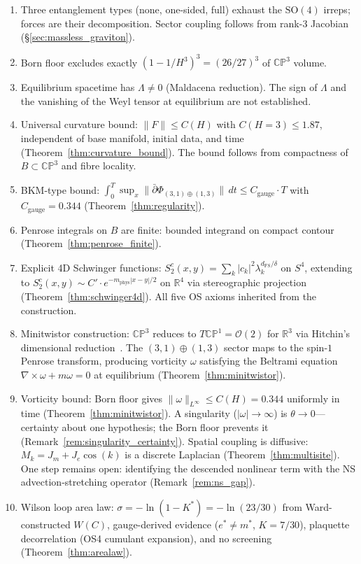 \documentclass[11pt,a4paper]{article}
\theoremstyle{definition}
\theoremstyle{remark}
\newcommand{\CP}{\mathbb{CP}}
\newcommand{\R}{\mathbb{R}}
\newcommand{\dbar}{\bar{\partial}}
\begin{document}
\begin{enumerate}[nosep]
\item Three entanglement types (none, one-sided, full) exhaust the $\mathrm{SO}(4)$ irreps; forces are their decomposition. Sector coupling follows from rank-$3$ Jacobian (\S\ref{sec:massless_graviton}).
\item Born floor excludes exactly $(1-1/H^3)^3=(26/27)^3$ of $\CP^3$ volume.
\item Equilibrium spacetime has $\Lambda\neq 0$ (Maldacena reduction). The sign of $\Lambda$ and the vanishing of the Weyl tensor at equilibrium are not established.
\item Universal curvature bound: $\|F\|\leq C(H)$ with $C(H\!=\!3)\leq 1.87$, independent of base manifold, initial data, and time (Theorem~\ref{thm:curvature_bound}). The bound follows from compactness of $B\subset\CP^3$ and fibre locality.
\item BKM-type bound: $\int_0^T\!\sup_x\|\dbar\Phi_{(3,1)\oplus(1,3)}\|\,dt\leq C_{\mathrm{gauge}}\cdot T$ with $C_{\mathrm{gauge}}=0.344$ (Theorem~\ref{thm:regularity}).
\item Penrose integrals on $B$ are finite: bounded integrand on compact contour (Theorem~\ref{thm:penrose_finite}).
\item Explicit 4D Schwinger functions: $S_2^c(x,y)=\sum_k|c_k|^2\lambda_k^{d_{\mathrm{FS}}/\delta}$ on $S^4$, extending to $S_2^c(x,y)\sim C'\cdot e^{-m_{\mathrm{phys}}|x-y|/2}$ on $\R^4$ via stereographic projection (Theorem~\ref{thm:schwinger4d}). All five OS axioms inherited from the construction.
\item Minitwistor construction: $\CP^3$ reduces to $T\CP^1=\mathcal{O}(2)$ for $\R^3$ via Hitchin's dimensional reduction~\cite{Hitchin1982}. The $(3,1)\oplus(1,3)$ sector maps to the spin-$1$ Penrose transform, producing vorticity $\omega$ satisfying the Beltrami equation $\nabla\times\omega+m\omega=0$ at equilibrium (Theorem~\ref{thm:minitwistor}).
\item Vorticity bound: Born floor gives $\|\omega\|_{L^\infty}\leq C(H)=0.344$ uniformly in time (Theorem~\ref{thm:minitwistor}). A singularity ($|\omega|\to\infty$) is $\theta\to 0$---certainty about one hypothesis; the Born floor prevents it (Remark~\ref{rem:singularity_certainty}). Spatial coupling is diffusive: $M_k=J_m+J_e\cos(k)$ is a discrete Laplacian (Theorem~\ref{thm:multisite}). One step remains open: identifying the descended nonlinear term with the NS advection-stretching operator (Remark~\ref{rem:ns_gap}).
\item Wilson loop area law: $\sigma=-\ln(1-K^*)=-\ln(23/30)$ from Ward-constructed $W(C)$, gauge-derived evidence ($e^*\neq m^*$, $K=7/30$), plaquette decorrelation (OS4 cumulant expansion), and no screening (Theorem~\ref{thm:arealaw}).
\end{enumerate}
\end{document}
